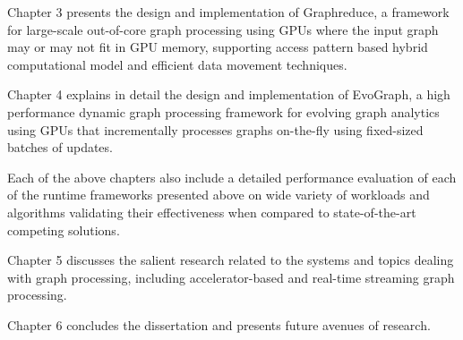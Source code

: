 Chapter 3 presents the design and implementation of Graphreduce, a framework for large-scale out-of-core graph processing using GPUs where
the input graph may or may not fit in GPU memory, supporting access pattern based
hybrid computational model and efficient data movement techniques.

Chapter 4 explains in detail the design and implementation of EvoGraph, a high performance dynamic graph processing framework for evolving
graph analytics using GPUs that incrementally processes graphs on-the-fly using fixed-sized batches of updates. 

Each of the above chapters also include a detailed performance evaluation of each of the  runtime frameworks presented above on wide variety of workloads and algorithms validating their effectiveness when compared to state-of-the-art competing solutions.

Chapter 5 discusses the salient research related to the systems and topics dealing with graph processing, including accelerator-based and real-time streaming graph processing. 

Chapter 6  concludes the dissertation and presents future avenues of research.